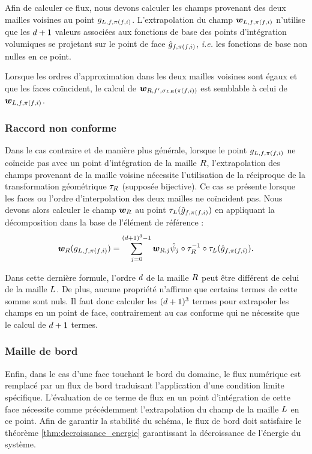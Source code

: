 Afin de calculer ce flux, nous devons calculer les champs provenant des deux
mailles voisines au point $g_{L,f,\pi(f,i)}$.
L’extrapolation du champ $\bm{w}_{L,f,\pi(f,i)}$ n’utilise que
les $d + 1$ valeurs associées aux fonctions de base des points d’intégration
volumiques se projetant sur le point de face $\hat{g}_{f,\pi(f,i)}$,
\textit{i.e.} les fonctions de base non nulles en ce point.

Lorsque les ordres d’approximation dans les deux mailles voisines sont égaux
et que les faces coïncident, le calcul de $\bm{w}_{R,f',\sigma_{L R}(\pi(f,i))}$
est semblable à celui de $\bm{w}_{L,f,\pi(f,i)}$.


\subsubsection{Raccord non conforme}
\label{sssect:terme_de_flux_non_conforme}

Dans le cas contraire et de manière plus générale,
lorsque le point $g_{L,f,\pi(f,i)}$ ne coïncide pas
avec un point d'intégration de la maille $R$, l'extrapolation des champs provenant
de la maille voisine nécessite l'utilisation de la réciproque de la transformation
géométrique $\tau_{R}$ (supposée bijective).
Ce cas se présente lorsque les faces ou l'ordre d'interpolation des deux mailles ne coïncident pas.
Nous devons alors calculer le champ $\bm{w}_R$ au point
$\tau_{L} (\hat{g}_{f,\pi(f,i)})$ en appliquant la décomposition dans la base
de l'élément de référence :
\begin{align}
	\bm{w}_R(g_{L,f,\pi(f,i)}) =
	\sum_{j=0}^{(d + 1)^3 - 1} \bm{w}_{R,j}
	\hat{\psi}_{j} \circ \tau_{R}^{-1} \circ \tau_{L} (\hat{g}_{f,\pi(f,i)})
	\label{eq:extract_complete} .
\end{align}

Dans cette dernière formule, l'ordre $d$ de la maille $R$ peut être différent
de celui de la maille $L$. De plus, aucune propriété n'affirme que certains termes
de cette somme sont nuls. Il faut donc calculer les $(d + 1)^3$ termes pour extrapoler
les champs en un point de face, contrairement au cas conforme qui ne nécessite
que le calcul de $d + 1$ termes.


\subsubsection{Maille de bord}
\label{sssect:terme_de_flux_bord}


Enfin, dans le cas d’une face touchant le bord du domaine, le flux numérique est
remplacé par un flux de bord traduisant l’application d’une condition limite
spécifique. L’évaluation de ce terme de flux en un point d’intégration de cette
face nécessite comme précédemment l'extrapolation du champ de la maille $L$ en ce point.
Afin de garantir la stabilité du schéma, le flux de bord doit satisfaire le
théorème \ref{thm:decroissance_energie} garantissant la décroissance de
l’énergie du système.

